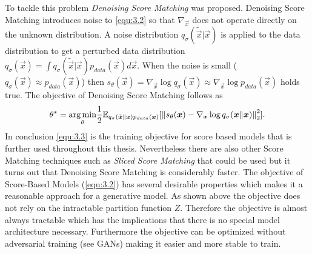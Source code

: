 %
%
To tackle this problem \textit{Denoising Score Matching} \cite{denoise_score} was proposed. Denoising Score Matching introduces noise to \cref{equ:3.2} so that $\nabla_{\vec{x}}$ does not operate directly on the unknown distribution. A noise distribution $q_\sigma(\tilde{\vec{x}}|\vec{x})$ is applied to the data distribution to get a perturbed data distribution $q_\sigma(\vec{x})=\int q_\sigma(\tilde{\vec{x}}|\vec{x})p_{data}(\vec{x})d\vec{x}$. When the noise is small ($q_\sigma(\vec{x})\approx p_{data}(\vec{x})$) then $s_\theta(\vec{x})=\nabla_{\vec{x}}\log q_\sigma(\vec{x})\approx\nabla_{\vec{x}}\log p_{data}(\vec{x})$ holds true. The objective of Denoising Score Matching follows as
%
\begin{equation} \label{equ:3.3}
    \theta^*=\underset{\theta}{\arg\min}\frac{1}{2}\mathbb{E}_{q_\sigma(\tilde{\boldsymbol{x}}\lVert\boldsymbol{x})p_{data}(\boldsymbol{x})}[\left\lVert s_\theta(\boldsymbol{x})-\nabla_{\boldsymbol{x}}\log q_\sigma(\boldsymbol{x}\lVert\boldsymbol{x})\right\rVert^2_2].
\end{equation}
%
In conclusion \cref{equ:3.3} is the training objective for score based models that is further used throughout this thesis. Nevertheless there are also other Score Matching techniques such as \textit{Sliced Score Matching} \cite{song2019sliced} that could be used but it turns out that Denoising Score Matching is considerably faster. The objective of Score-Based Models (\cref{equ:3.2}) has several desirable properties which makes it a reasonable approach for a generative model. As shown above the objective does not rely on the intractable partition function $Z$. Therefore the objective is almost always tractable which has the implications that there is no special model architecture necessary. Furthermore the objective can be optimized without adversarial training (see GANs) making it easier and more stable to train. %

